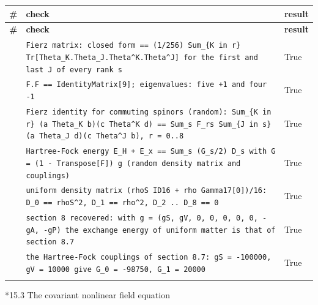 \documentclass[10pt,a4paper]{article}
\makeatletter
\renewcommand\subsubsection{\@startsection{subsubsection}{3}{\z@}{-3.25ex\@plus -1ex \@minus -.2ex}{1.5ex \@plus .2ex}{\normalfont\normalsize\bfseries\raggedright}}
\makeatother
\begin{document}
{\footnotesize
\begin{longtable}{>{\raggedright\arraybackslash}p{}>{\raggedright\arraybackslash}p{}>{\raggedright\arraybackslash}p{}}
\toprule
\textbf{\#} & \textbf{check} & \textbf{result} \\
\midrule\endfirsthead
\toprule
\textbf{\#} & \textbf{check} & \textbf{result} \\
\midrule\endhead
\endfoot
\bottomrule\endlastfoot
310 & \texttt{Fierz matrix: closed form == (1/\allowbreak{}256) Sum\_\allowbreak{}\{K in r\} Tr[Theta\_\allowbreak{}K.Theta\_\allowbreak{}J.Theta\textasciicircum{}K.Theta\textasciicircum{}J] for the first and last J of every rank s} & True \\
311 & \texttt{F.F == IdentityMatrix[9]; eigenvalues: five +1 and four -1} & True \\
312 & \texttt{Fierz identity for commuting spinors (random): Sum\_\allowbreak{}\{K in r\} (a Theta\_\allowbreak{}K b)(c Theta\textasciicircum{}K d) == Sum\_\allowbreak{}s F\_\allowbreak{}rs Sum\_\allowbreak{}\{J in s\} (a Theta\_\allowbreak{}J d)(c Theta\textasciicircum{}J b), r = 0..8} & True \\
313 & \texttt{Hartree-Fock energy E\_\allowbreak{}H + E\_\allowbreak{}x == Sum\_\allowbreak{}s (G\_\allowbreak{}s/\allowbreak{}2) D\_\allowbreak{}s with G = (1 - Transpose[F]) g (random density matrix and couplings)} & True \\
314 & \texttt{uniform density matrix (rhoS ID16 + rho Gamma17[0])/\allowbreak{}16: D\_\allowbreak{}0 == rhoS\textasciicircum{}2, D\_\allowbreak{}1 == rho\textasciicircum{}2, D\_\allowbreak{}2 .. D\_\allowbreak{}8 == 0} & True \\
315 & \texttt{section 8 recovered: with g = (gS, gV, 0, 0, 0, 0, 0, -gA, -gP) the exchange energy of uniform matter is that of section 8.7} & True \\
316 & \texttt{the Hartree-Fock couplings of section 8.7: gS = -100000, gV = 10000 give G\_\allowbreak{}0 = -98750, G\_\allowbreak{}1 = 20000} & True \\*
\end{longtable}}
\subsubsection*{15.3 The covariant nonlinear field equation}
\end{document}
